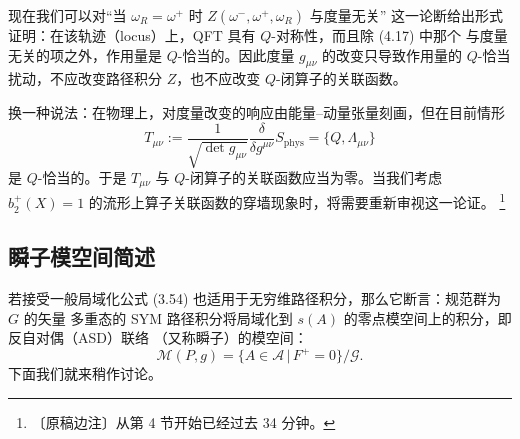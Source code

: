 
现在我们可以对“当 $\omega_R=\omega^+$ 时 $Z(\omega^-,\omega^+,\omega_R)$ 与度量无关”
这一论断给出形式证明：在该轨迹（locus）上，QFT 具有 $Q$-对称性，而且除 (4.17) 中那个
与度量无关的项之外，作用量是 $Q$-恰当的。因此度量 $g_{\mu\nu}$ 的改变只导致作用量的
$Q$-恰当扰动，不应改变路径积分 $Z$，也不应改变 $Q$-闭算子的关联函数。

换一种说法：在物理上，对度量改变的响应由能量--动量张量刻画，但在目前情形
\begin{equation}
  T_{\mu\nu}:=\frac{1}{\sqrt{\det g_{\mu\nu}}}
  \frac{\delta}{\delta g^{\mu\nu}}S_{\mathrm{phys}}
  =\{Q,\Lambda_{\mu\nu}\}
  \tag{4.20}
\end{equation}
是 $Q$-恰当的。于是 $T_{\mu\nu}$ 与 $Q$-闭算子的关联函数应当为零。当我们考虑
$b_{2}^{+}(X)=1$ 的流形上算子关联函数的穿墙现象时，将需要重新审视这一论证。
\footnote{〔原稿边注〕从第 4 节开始已经过去 34 分钟。}

\subsection{瞬子模空间简述}
\label{sec:4-3}

若接受一般局域化公式 (3.54) 也适用于无穷维路径积分，那么它断言：规范群为 $G$ 的矢量
多重态的 SYM 路径积分将局域化到 $s(A)$ 的零点模空间上的积分，即反自对偶（ASD）联络
（又称瞬子）的模空间：
\begin{equation}
  \mathcal{M}(P,g)=\{A\in\mathcal{A}\,|\,F^{+}=0\}/\mathcal{G}.
  \tag{4.21}
\end{equation}
下面我们就来稍作讨论。

